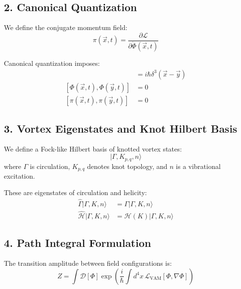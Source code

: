 \documentclass[12pt]{article}
\begin{document}
\subsection*{2. Canonical Quantization}

We define the conjugate momentum field:
\begin{equation}
\pi(\vec{x}, t) = \frac{\partial \mathcal{L}}{\partial \dot{\Phi}(\vec{x}, t)}
\label{eq:pi}
\end{equation}

Canonical quantization imposes:
\begin{align}
[\Phi(\vec{x}, t), \pi(\vec{y}, t)] &= i \hbar \delta^3(\vec{x} - \vec{y}) \label{eq:commutator1} \\
[\Phi(\vec{x}, t), \Phi(\vec{y}, t)] &= 0 \label{eq:commutator2} \\
[\pi(\vec{x}, t), \pi(\vec{y}, t)] &= 0 \label{eq:commutator3}
\end{align}

\subsection*{3. Vortex Eigenstates and Knot Hilbert Basis}

We define a Fock-like Hilbert basis of knotted vortex states:
\begin{equation}
|\Gamma, K_{p,q}, n\rangle
\end{equation}
where \( \Gamma \) is circulation, \( K_{p,q} \) denotes knot topology, and \( n \) is a vibrational excitation.

These are eigenstates of circulation and helicity:
\begin{align}
\hat{\Gamma} | \Gamma, K, n \rangle &= \Gamma | \Gamma, K, n \rangle \\
\hat{\mathcal{H}} | \Gamma, K, n \rangle &= \mathcal{H}(K) | \Gamma, K, n \rangle
\end{align}

\subsection*{4. Path Integral Formulation}

The transition amplitude between field configurations is:
\begin{equation}
Z = \int \mathcal{D}[\Phi] \exp\left( \frac{i}{\hbar} \int d^4x\, \mathcal{L}_{\text{VAM}}[\Phi, \nabla \Phi] \right)
\label{eq:path_integral}
\end{equation}
\end{document}
